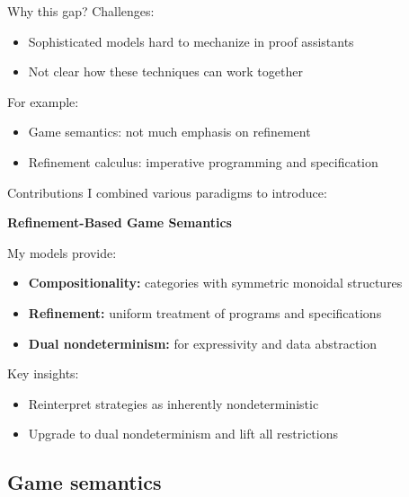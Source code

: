 \documentclass[aspectratio=141]{beamer}
\begin{document}
\begin{frame}{Why this gap?} %
  Challenges:
  \begin{itemize}
    \item Sophisticated models hard to mechanize in proof assistants
    \item Not clear how these techniques can work together
  \end{itemize}

  For example:
  \begin{itemize}
    \item Game semantics: not much emphasis on refinement
    \item Refinement calculus: imperative programming and specification
  \end{itemize}
\end{frame}  

\begin{frame}{Contributions} %
  I combined various paradigms to introduce:
  \begin{center}
  \textbf{Refinement-Based Game Semantics}
  \end{center}

  \pause
  My models provide:
  \begin{itemize}
    \item \textbf{Compositionality:}
      categories with symmetric monoidal structures
    \item \textbf{Refinement:}
      uniform treatment of programs and specifications
    \item \textbf{Dual nondeterminism:}
      for expressivity and data abstraction
  \end{itemize}

  \pause
  Key insights:
  \begin{itemize}
    \item Reinterpret strategies as inherently nondeterministic
    \item Upgrade to dual nondeterminism and lift all restrictions
  \end{itemize}
\end{frame}

\subsection{Game semantics}
\end{document}
